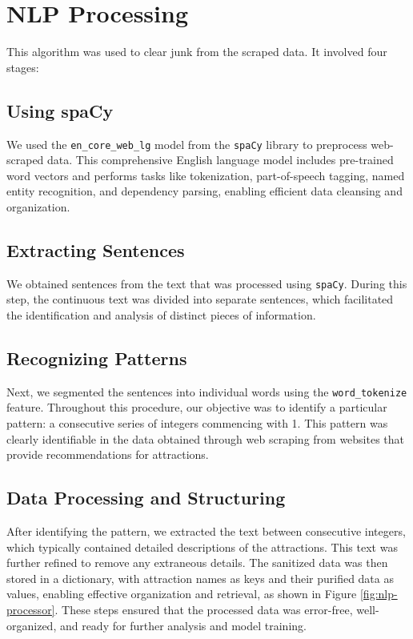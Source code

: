\documentclass[conference]{IEEEtran}
\begin{document}
\section{NLP Processing}

    This algorithm was used to clear junk from the scraped data. It involved four stages:

    \subsection{Using spaCy}
        We used the \texttt{en\_core\_web\_lg} model from the \texttt{spaCy} library to preprocess web-scraped data. This comprehensive English language model includes pre-trained word vectors and performs tasks like tokenization, part-of-speech tagging, named entity recognition, and dependency parsing, enabling efficient data cleansing and organization.


    \subsection{Extracting Sentences}
        We obtained sentences from the text that was processed using \texttt{spaCy}. During this step, the continuous text was divided into separate sentences, which facilitated the identification and analysis of distinct pieces of information.

    \subsection{Recognizing Patterns}
        Next, we segmented the sentences into individual words using the \texttt{word\_tokenize} feature. Throughout this procedure, our objective was to identify a particular pattern: a consecutive series of integers commencing with 1. This pattern was clearly identifiable in the data obtained through web scraping from websites that provide recommendations for attractions.

    \subsection{Data Processing and Structuring}
        After identifying the pattern, we extracted the text between consecutive integers, which typically contained detailed descriptions of the attractions. This text was further refined to remove any extraneous details. The sanitized data was then stored in a dictionary, with attraction names as keys and their purified data as values, enabling effective organization and retrieval, as shown in Figure \ref{fig:nlp-processor}. These steps ensured that the processed data was error-free, well-organized, and ready for further analysis and model training.
\end{document}
